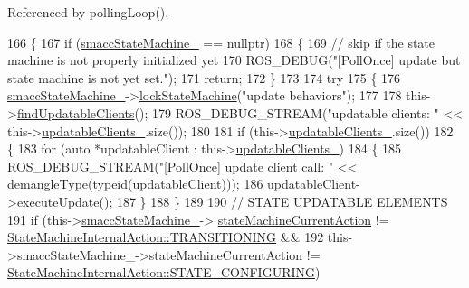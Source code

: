 Referenced by polling\+Loop().


\begin{DoxyCode}
166     \{
167         \textcolor{keywordflow}{if} (\hyperlink{classsmacc_1_1SignalDetector_a46025de6ac7b5980e22144f9703236a4}{smaccStateMachine\_} == \textcolor{keyword}{nullptr})
168         \{
169             \textcolor{comment}{// skip if the state machine is not properly initialized yet}
170             ROS\_DEBUG(\textcolor{stringliteral}{"[PollOnce] update but state machine is not yet set."});
171             \textcolor{keywordflow}{return};
172         \}
173 
174         \textcolor{keywordflow}{try}
175         \{
176             \hyperlink{classsmacc_1_1SignalDetector_a46025de6ac7b5980e22144f9703236a4}{smaccStateMachine\_}->\hyperlink{classsmacc_1_1ISmaccStateMachine_a5c8d4c9a4b11c7950266a00e48080ce3}{lockStateMachine}(\textcolor{stringliteral}{"update behaviors"});
177 
178             this->\hyperlink{classsmacc_1_1SignalDetector_a47ec2df560e2e33758ce3975bece9385}{findUpdatableClients}();
179             ROS\_DEBUG\_STREAM(\textcolor{stringliteral}{"updatable clients: "} << this->\hyperlink{classsmacc_1_1SignalDetector_a01a457b4ec935473d6426efb7b87e683}{updatableClients\_}.size());
180 
181             \textcolor{keywordflow}{if} (this->\hyperlink{classsmacc_1_1SignalDetector_a01a457b4ec935473d6426efb7b87e683}{updatableClients\_}.size())
182             \{
183                 \textcolor{keywordflow}{for} (\textcolor{keyword}{auto} *updatableClient : this->\hyperlink{classsmacc_1_1SignalDetector_a01a457b4ec935473d6426efb7b87e683}{updatableClients\_})
184                 \{
185                     ROS\_DEBUG\_STREAM(\textcolor{stringliteral}{"[PollOnce] update client call:  "} << 
      \hyperlink{namespacesmacc_1_1introspection_a670e39ccea29952859df4e2d0e45077b}{demangleType}(\textcolor{keyword}{typeid}(updatableClient)));
186                     updatableClient->executeUpdate();
187                 \}
188             \}
189 
190             \textcolor{comment}{// STATE UPDATABLE ELEMENTS}
191             \textcolor{keywordflow}{if} (this->\hyperlink{classsmacc_1_1SignalDetector_a46025de6ac7b5980e22144f9703236a4}{smaccStateMachine\_}->
      \hyperlink{classsmacc_1_1ISmaccStateMachine_a654a98ba86c4c1013ac3c371f293d950}{stateMachineCurrentAction} != 
      \hyperlink{namespacesmacc_a0889aff43c93fe5285109819d2898144a5e174e130ee1847f37541ba5786207a3}{StateMachineInternalAction::TRANSITIONING} &&
192                 this->smaccStateMachine\_->stateMachineCurrentAction != 
      \hyperlink{namespacesmacc_a0889aff43c93fe5285109819d2898144a32406d3560b9f36b3e6e3b84454e1be5}{StateMachineInternalAction::STATE\_CONFIGURING})

\end{DoxyCode}
